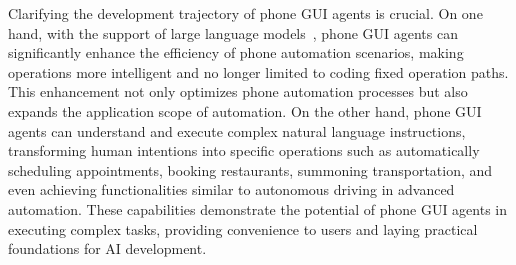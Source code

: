 

Clarifying the development trajectory of phone GUI agents is crucial. On one hand, with the support of large language models~\cite{radford2018gpt1,radford2019gpt2,brown2020gpt3,achiam2023gpt}, phone GUI agents can significantly enhance the efficiency of phone automation scenarios, making operations more intelligent and no longer limited to coding fixed operation paths. This enhancement not only optimizes phone automation processes but also expands the application scope of automation. On the other hand, phone GUI agents can understand and execute complex natural language instructions, transforming human intentions into specific operations such as automatically scheduling appointments, booking restaurants, summoning transportation, and even achieving functionalities similar to autonomous driving in advanced automation. These capabilities demonstrate the potential of phone GUI agents in executing complex tasks, providing convenience to users and laying practical foundations for AI development.


